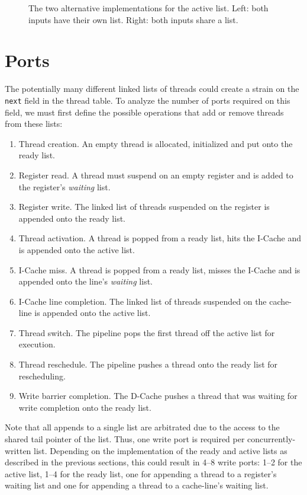 \begin{figure}
 \begin{center}
  
  \caption{The two alternative implementations for the active list. Left: both inputs have their own list. Right: both inputs share a list.}
  \label{fig:activelist-alts}
 \end{center}
\end{figure}

\section{Ports}
The potentially many different linked lists of threads could create a strain on the {\tt next} field in the thread table. To analyze the number of ports required on this field, we must first define the possible operations that add or remove threads from these lists:
\begin{enumerate}
\item Thread creation. An empty thread is allocated, initialized and put onto the ready list.
\item Register read. A thread must suspend on an empty register and is added to the register's \emph{waiting} list.
\item Register write. The linked list of threads suspended on the register is appended onto the ready list.
\item Thread activation. A thread is popped from a ready list, hits the I-Cache and is appended onto the active list.
\item I-Cache miss. A thread is popped from a ready list, misses the I-Cache and is appended onto the line's \emph{waiting} list.
\item I-Cache line completion. The linked list of threads suspended on the cache-line is appended onto the active list.
\item Thread switch. The pipeline pops the first thread off the active list for execution.
\item Thread reschedule. The pipeline pushes a thread onto the ready list for rescheduling.
\item Write barrier completion. The D-Cache pushes a thread that was waiting for write completion onto the ready list.
\end{enumerate}
Note that all appends to a single list are arbitrated due to the access to the shared tail pointer of the list. Thus, one write port is required per concurrently-written list. Depending on the implementation of the ready and active lists as described in the previous sections, this could result in 4--8 write ports: 1--2 for the active list, 1--4 for the ready list, one for appending a thread to a register's waiting list and one for appending a thread to a cache-line's waiting list. 

